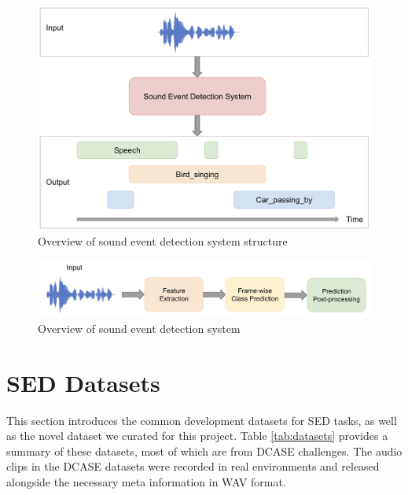 \begin{figure}[!htb]
    \centering
    \includegraphics[width=\textwidth]{fig/sed-system.png}
    \caption{Overview of sound event detection system structure}
    \label{fig:sed-system}
\end{figure}

\begin{figure}[!htb]
    \centering
    \includegraphics[width=\textwidth]{fig/sed-structure.png}
    \caption{Overview of sound event detection system}
    \label{fig:sed-structure}
\end{figure}

\section{SED Datasets}
This section introduces the common development datasets for SED tasks, as well as the novel dataset we curated for this project. Table \ref{tab:datasets} provides a summary of these datasets, most of which are from DCASE challenges. The audio clips in the DCASE datasets were recorded in real environments and released alongside the necessary meta information in WAV format.

